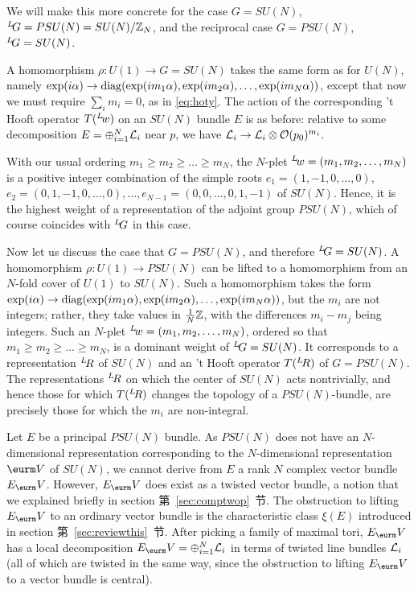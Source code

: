 We will make this more concrete for the case $G=SU(N)$,
$^L\negthinspace G=PSU(N)=SU(N)/\Bbb{Z}_N$, and the reciprocal
case $G=PSU(N)$, $^L\negthinspace G=SU(N)$.

A homomorphism $\rho:U(1)\to G=SU(N)$ takes the same form as for
$U(N)$, namely $\exp(i\alpha)\to{\rm
diag}(\exp({im_1\alpha}),\exp({im_2\alpha}),\dots,\exp(im_N\alpha))$,
except that now we must require $\sum_im_i=0$, as in \eqref{eq:hoty}.  The
action of the corresponding 't Hooft operator $T(^L\negthinspace
w)$ on an $SU(N)$ bundle $E$ is as before: relative to some
decomposition $E=\oplus_{i=1}^N{\cal L}_i$ near $p$, we have
${\cal L}_i\to {\cal L}_i\otimes {\cal O}(p_0)^{m_i}$.

With our usual ordering $m_1\geq m_2\geq\dots\geq m_N$, the
$N$-plet $^L\negthinspace w=(m_1,m_2,\dots,m_N)$ is a positive
integer combination of the simple roots $e_1=(1,-1,0,\dots,0)$,
$e_2=(0,1,-1,0,\dots,0),\dots ,e_{N-1}=(0,0,\dots,0,1,-1)$ of
$SU(N)$. Hence, it is the highest weight of a representation of
the adjoint group $PSU(N)$, which of course coincides with
$^L\negthinspace G$ in this case.

Now let us discuss the case that $G=PSU(N)$, and therefore
$^L\negthinspace G=SU(N)$.  A homomorphism $\rho:U(1)\to PSU(N)$
can be lifted to a homomorphism from an $N$-fold cover of $U(1)$
to $SU(N)$. Such a homomorphism takes the form $\exp(i\alpha)\to
{\rm
diag}(\exp(im_1\alpha),\exp(im_2\alpha),\dots,\exp(im_N\alpha))$,
but the $m_i$ are not integers; rather, they take values in
 ${1\over N}\Bbb{Z}$, with the differences $m_i-m_j$ being integers. Such an $N$-plet
$^L\negthinspace w=(m_1,m_2,\dots,m_N)$, ordered so that $m_1\geq
m_2\geq \dots\geq m_N$, is a dominant weight of $^L\negthinspace
G=SU(N)$. It corresponds to a representation $^L\negthinspace R$
of $SU(N)$ and an 't Hooft operator $T(^L\negthinspace R)$ of
$G=PSU(N)$. The representations $^L\negthinspace R$ on which the
center of $SU(N)$ acts nontrivially, and hence those for which
$T(^L\negthinspace R)$ changes the topology of a $PSU(N)$-bundle,
are precisely those for which the $m_i$ are non-integral.

Let $E$ be a principal $PSU(N)$ bundle.  As $PSU(N)$ does not have
an $N$-dimensional representation corresponding to the
$N$-dimensional representation $\VV$ of $SU(N)$, we cannot derive
from $E$ a rank $N$ complex vector bundle $E_\VV$.  However,
$E_\VV$ does exist as a twisted vector bundle, a notion that we
explained briefly  in section 第~\ref{sec:comptwop}~节.  The obstruction to
lifting $E_\VV$ to an ordinary vector bundle is the characteristic
class $\xi(E)$ introduced in section 第~\ref{sec:reviewthis}~节.  After picking a
family of maximal tori, $E_\VV$ has a local decomposition
$E_\VV=\oplus_{i=1}^N{\cal L}_i$ in terms of twisted line bundles
${\cal L}_i$ (all of which are twisted in the same way, since the
obstruction to lifting $E_\VV$ to a vector bundle is central).

